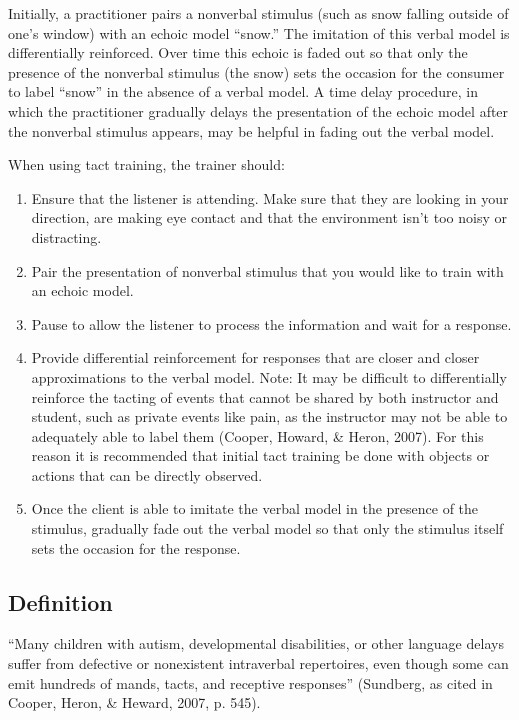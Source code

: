 Initially, a practitioner pairs a nonverbal stimulus (such as snow falling outside of one's window) with an echoic model ``snow.''  The imitation of this verbal model is differentially reinforced.  Over time this echoic is faded out so that only the presence of the nonverbal stimulus (the snow) sets the occasion for the consumer to label ``snow'' in the absence of a verbal model. A time delay procedure, in which the practitioner gradually delays the presentation of the echoic model after the nonverbal stimulus appears, may be helpful in fading out the verbal model.  

When using tact training, the trainer should:
\begin{enumerate}
\item Ensure that the listener is attending.  Make sure that they are looking in your direction, are making eye contact and that the environment isn't too noisy or distracting.
\item Pair the presentation of nonverbal stimulus that you would like to train with an echoic model.  
\item Pause to allow the listener to process the information and wait for a response.
\item Provide differential reinforcement for responses that are closer and closer approximations to the verbal model. Note:  It may be difficult to differentially reinforce the tacting of events that cannot be shared by both instructor and student, such as private events like pain, as the instructor may not be able to adequately able to label them (Cooper, Howard, \& Heron, 2007).  For this reason it is recommended that initial tact training be done with objects or actions that can be directly observed.
\item Once the client is able to imitate the verbal model in the presence of the stimulus, gradually fade out the verbal model so that only the stimulus itself sets the occasion for the response. 
\end{enumerate}
%
\subsection{Definition}
``Many children with autism, developmental disabilities, or other language delays suffer from defective or nonexistent intraverbal repertoires, even though some can emit hundreds of mands, tacts, and receptive responses'' (Sundberg, as cited in Cooper, Heron, \& Heward, 2007, p. 545).  


